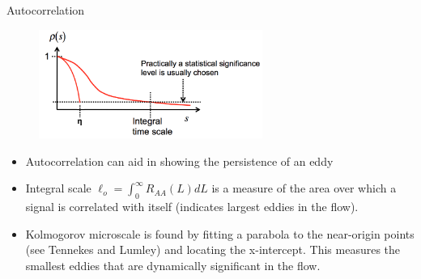 \begin{frame}{Autocorrelation}
\begin{figure}
	\includegraphics[width=0.65\textwidth]{auto1}
\end{figure}
\begin{itemize}
	\item Autocorrelation can aid in showing the persistence of an eddy
	\item Integral scale $\ell_o = \int_0^\infty R_{AA}(L)dL$ is a measure of the area over which a signal is correlated with itself (indicates largest eddies in the flow).
	\item Kolmogorov microscale is found by fitting a parabola to the near-origin points (see Tennekes and Lumley) and locating the x-intercept. This measures the smallest eddies that are dynamically significant in the flow.
\end{itemize}
\end{frame}

